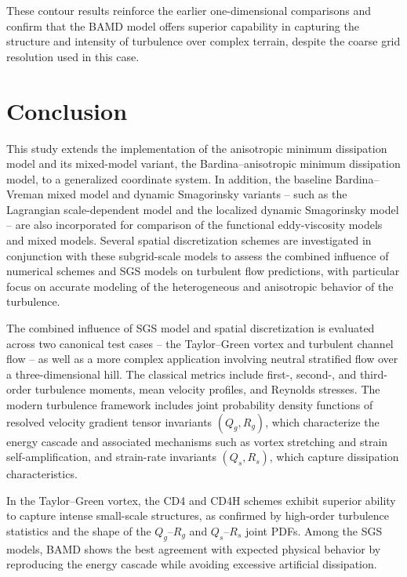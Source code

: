 \documentclass[final,3p]{elsarticle}
\begin{document}
These contour results reinforce the earlier one-dimensional comparisons and confirm that the BAMD model offers superior capability in capturing the structure and intensity of turbulence over complex terrain, despite the coarse grid resolution used in this case.


\section{\label{sec:conclusion}
        Conclusion}

This study extends the implementation of the anisotropic minimum dissipation model and its mixed-model variant, the Bardina–anisotropic minimum dissipation model, to a generalized coordinate system. In addition, the baseline Bardina–Vreman mixed model and dynamic Smagorinsky variants -- such as the Lagrangian scale-dependent model and the localized dynamic Smagorinsky model -- are also incorporated for comparison of the functional eddy-viscosity models and mixed models. Several spatial discretization schemes are investigated in conjunction with these subgrid-scale models to assess the combined influence of numerical schemes and SGS models on turbulent flow predictions, with particular focus on accurate modeling of the heterogeneous and anisotropic behavior of the turbulence.

The combined influence of SGS model and spatial discretization is evaluated across two canonical test cases -- the Taylor--Green vortex and turbulent channel flow -- as well as a more complex application involving neutral stratified flow over a three-dimensional hill. The classical metrics include first-, second-, and third-order turbulence moments, mean velocity profiles, and Reynolds stresses. The modern turbulence framework includes joint probability density functions of resolved velocity gradient tensor invariants \( (Q_g, R_g) \), which characterize the energy cascade and associated mechanisms such as vortex stretching and strain self-amplification, and strain-rate invariants \( (Q_s, R_s) \), which capture dissipation characteristics.

In the Taylor–Green vortex, the CD4 and CD4H schemes exhibit superior ability to capture intense small-scale structures, as confirmed by high-order turbulence statistics and the shape of the \( Q_g \)–\( R_g \) and \( Q_s \)–\( R_s \) joint PDFs. Among the SGS models, BAMD shows the best agreement with expected physical behavior by reproducing the energy cascade while avoiding excessive artificial dissipation.
\end{document}
